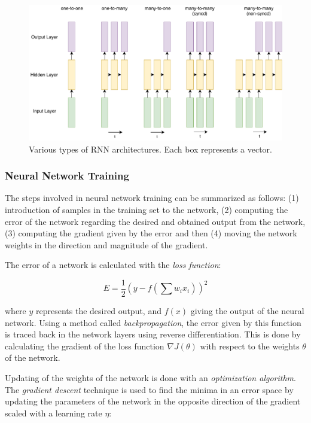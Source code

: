 \begin{figure}[t]
  \centering
  \includegraphics[width=\linewidth]{img/rnn_types.pdf}
  \caption[Various types of RNN architectures.]{Various types of RNN architectures. Each box represents a vector. }
  \label{sota:rnn_connections}
\end{figure}

\subsubsection*{Neural Network Training}
The steps involved in neural network training can be summarized as follows: (1) introduction of samples in the training set to the network, (2) computing the error of the network regarding the desired and obtained output from the network, (3) computing the gradient given by the error and then (4) moving the network weights in the direction and magnitude of the gradient. 

The error of a network is calculated with the \textit{loss function}:

\begin{equation}
    E = \frac { 1 } { 2 } \left( y - f \left( \sum w _ { i } x _ { i } \right) \right) ^ { 2 }
\end{equation}

where $y$ represents the desired output, and $f(x)$ giving the output of the neural network. Using a method called \textit{backpropagation}, the error given by this function is traced back in the network layers using reverse differentiation. This is done by calculating the gradient of the loss function $\nabla J ( \theta )$ with respect to the weights $ \theta $ of the network.

Updating of the weights of the network is done with an \textit{optimization algorithm}. The \textit{gradient descent} technique is used to find the minima in an error space by updating the parameters of the network in the opposite direction of the gradient scaled with a learning rate $\eta$:

